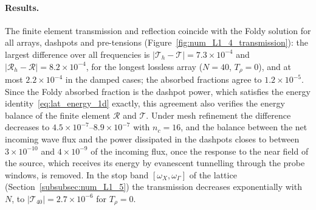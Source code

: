 {\paragraph{Results.} The finite element transmission and reflection coincide with the Foldy solution for all arrays, dashpots and pre-tensions (Figure~\ref{fig:num_L1_4_transmission}): the largest difference over all frequencies is $|\mathcal{T}_h-\mathcal{T}|=7.3\times10^{-4}$ and $|\mathcal{R}_h-\mathcal{R}|=8.2\times10^{-4}$, for the longest lossless array ($N=40$, $T_\rho=0$), and at most $2.2\times10^{-4}$ in the damped cases; the absorbed fractions agree to $1.2\times10^{-5}$. Since the Foldy absorbed fraction is the dashpot power, which satisfies the energy identity~\eqref{eq:lat_energy_1d} exactly, this agreement also verifies the energy balance of the finite element $\mathcal{R}$ and $\mathcal{T}$. Under mesh refinement the difference decreases to $4.5\times10^{-7}$--$8.9\times10^{-7}$ with $n_c=16$, and the balance between the net incoming wave flux and the power dissipated in the dashpots closes to between $3\times10^{-10}$ and $4\times10^{-9}$ of the incoming flux, once the response to the near field of the source, which receives its energy by evanescent tunnelling through the probe windows, is removed. In the stop band $[\omega_X,\omega_\Gamma]$ of the lattice (Section~\ref{subsubsec:num_L1_5}) the transmission decreases exponentially with $N$, to $|\mathcal{T}_{40}|=2.7\times10^{-6}$ for $T_\rho=0$.

}
